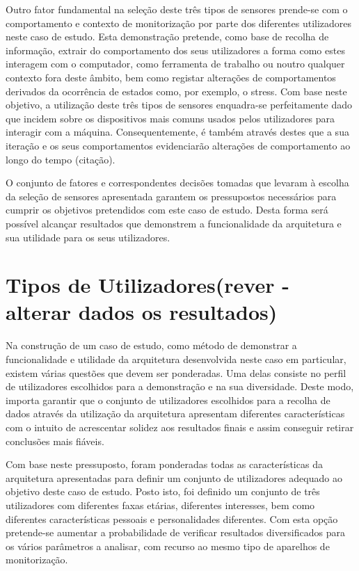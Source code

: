 Outro fator fundamental na seleção deste três tipos de sensores prende-se com o comportamento e contexto de monitorização por parte dos diferentes utilizadores neste caso de estudo. Esta demonstração pretende, como base de recolha de informação, extrair do comportamento dos seus utilizadores a forma como estes interagem com o computador, como ferramenta de trabalho ou noutro qualquer contexto fora deste âmbito, bem como registar alterações de comportamentos derivados da ocorrência de estados como, por exemplo, o stress. Com base neste objetivo, a utilização deste três tipos de sensores enquadra-se perfeitamente dado que incidem sobre os dispositivos mais comuns usados pelos utilizadores para interagir com a máquina. Consequentemente, é também através destes que a sua iteração e os seus comportamentos evidenciarão alterações de comportamento ao longo do tempo (citação). 

O conjunto de fatores e correspondentes decisões tomadas que levaram à escolha da seleção de sensores apresentada garantem os pressupostos necessários para cumprir os objetivos pretendidos com este caso de estudo. Desta forma será possível alcançar resultados que demonstrem a funcionalidade da arquitetura e sua utilidade para os seus utilizadores.



\section{Tipos de Utilizadores(rever - alterar dados os resultados)}

Na construção de um caso de estudo, como método de demonstrar a funcionalidade e utilidade da arquitetura desenvolvida neste caso em particular, existem várias questões que devem ser ponderadas. Uma delas consiste no perfil de utilizadores escolhidos para a demonstração e na sua diversidade. Deste modo, importa garantir que o conjunto de utilizadores escolhidos para a recolha de dados através da utilização da arquitetura apresentam diferentes características com o intuito de acrescentar solidez aos resultados finais e assim conseguir retirar conclusões mais fiáveis.

Com base neste pressuposto, foram ponderadas todas as características da arquitetura apresentadas para definir um conjunto de utilizadores adequado ao objetivo deste caso de estudo. Posto isto, foi definido um conjunto de três utilizadores com diferentes faxas etárias, diferentes interesses, bem como diferentes características pessoais e personalidades diferentes. Com esta opção pretende-se aumentar a probabilidade de verificar resultados diversificados para os vários parâmetros a analisar, com recurso ao mesmo tipo de aparelhos de monitorização.

